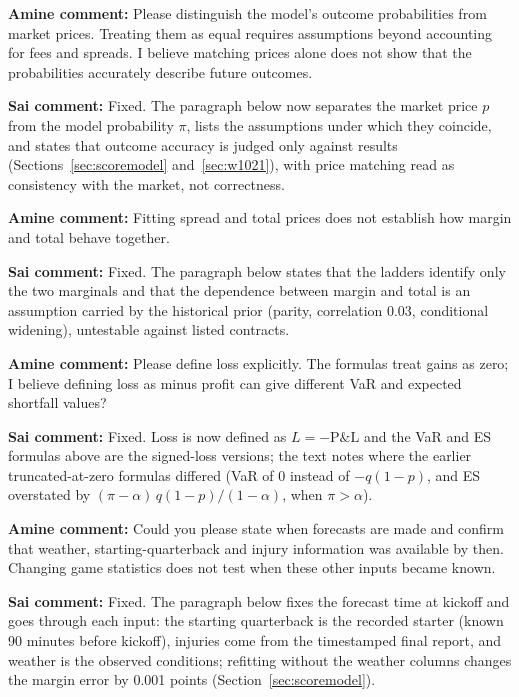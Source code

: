 
{\color{red}\textbf{Amine comment:} Please distinguish the model's outcome probabilities from market prices. Treating them as equal requires assumptions beyond accounting for fees and spreads. I believe matching prices alone does not show that the probabilities accurately describe future outcomes.}

{\color{blue}\textbf{Sai comment:} Fixed. The paragraph below now separates the market price $p$ from the model probability $\pi$, lists the assumptions under which they coincide, and states that outcome accuracy is judged only against results (Sections~\ref{sec:scoremodel} and~\ref{sec:w1021}), with price matching read as consistency with the market, not correctness.}

{\color{red}\textbf{Amine comment:} Fitting spread and total prices does not establish how margin and total behave together.}

{\color{blue}\textbf{Sai comment:} Fixed. The paragraph below states that the ladders identify only the two marginals and that the dependence between margin and total is an assumption carried by the historical prior (parity, correlation 0.03, conditional widening), untestable against listed contracts.}

{\color{red}\textbf{Amine comment:} Please define loss explicitly. The formulas treat gains as zero; I believe defining loss as minus profit can give different VaR and expected shortfall values?}

{\color{blue}\textbf{Sai comment:} Fixed. Loss is now defined as $L=-\text{P\&L}$ and the VaR and ES formulas above are the signed-loss versions; the text notes where the earlier truncated-at-zero formulas differed (VaR of $0$ instead of $-q(1-p)$, and ES overstated by $(\pi-\alpha)\,q(1-p)/(1-\alpha)$, when $\pi>\alpha$).}

{\color{red}\textbf{Amine comment:} Could you please state when forecasts are made and confirm that weather, starting-quarterback and injury information was available by then. Changing game statistics does not test when these other inputs became known.}

{\color{blue}\textbf{Sai comment:} Fixed. The paragraph below fixes the forecast time at kickoff and goes through each input: the starting quarterback is the recorded starter (known 90 minutes before kickoff), injuries come from the timestamped final report, and weather is the observed conditions; refitting without the weather columns changes the margin error by 0.001 points (Section~\ref{sec:scoremodel}).}

